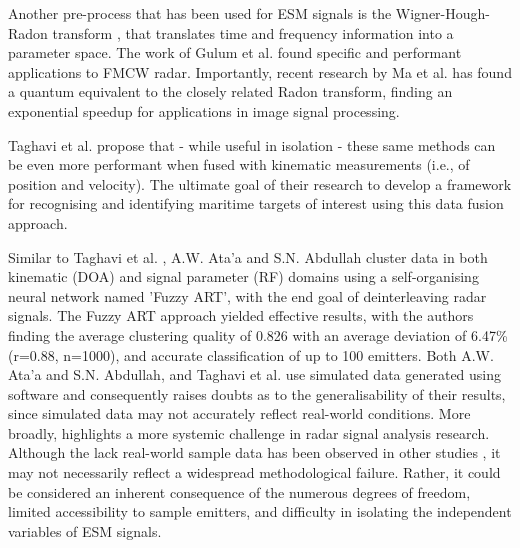 Another pre-process that has been used for \ac{ESM} signals is the Wigner-Hough-Radon transform \cite{gulum_parameter_2012}, that translates time and frequency information into a parameter space.
The work of Gulum et al. found specific and performant applications to \ac{FMCW} radar.
Importantly, recent research by Ma et al. \cite{ma_quantum_2021} has found a quantum equivalent to the closely related Radon transform, finding an exponential speedup for applications in image signal processing.

Taghavi et al. \cite{taghavi_object_2016} propose that - while useful in isolation - these same methods can be even more performant when fused with kinematic measurements (i.e., of position and velocity). 
The ultimate goal of their research to develop a framework for recognising and identifying maritime targets of interest using this data fusion approach.

Similar to Taghavi et al. \cite{taghavi_object_2016}, A.W. Ata'a and S.N. Abdullah \cite{alhashimi_deinterleaving_2007} cluster data in both kinematic (\ac{DOA}) and signal parameter (\ac{RF}) domains using a self-organising neural network named 'Fuzzy ART', with the end goal of deinterleaving radar signals.
The Fuzzy ART approach yielded effective results, with the authors finding the average clustering quality of 0.826 with an average deviation of 6.47\% (r=0.88, n=1000), and accurate classification of up to 100 emitters.
Both A.W. Ata'a and S.N. Abdullah, and Taghavi et al. use simulated data generated using software
and consequently raises doubts as to the generalisability of their results, since simulated data may not accurately reflect real-world conditions.
More broadly, highlights a more systemic challenge in radar signal analysis research.
Although the lack real-world sample data has been observed in other studies \cite{svensson_classification_2022, noone_neural_1999, mason_deep_2017}, it may not necessarily reflect a widespread methodological failure.
Rather, it could be considered an inherent consequence of the numerous degrees of freedom, limited accessibility to sample emitters, and difficulty in isolating the independent variables of \ac{ESM} signals.

